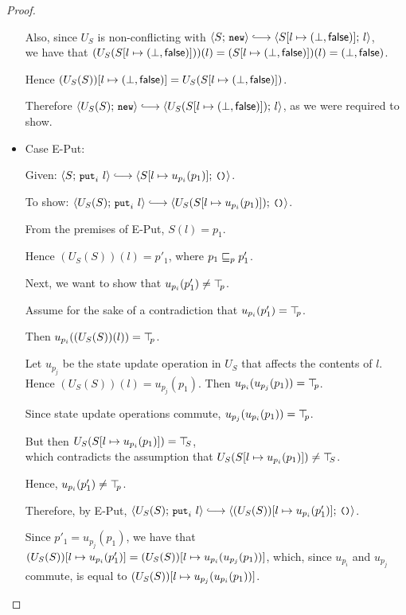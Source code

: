 \begin{proof}
\begin{itemize}
      Also, since $U_S$ is non-conflicting with $\config{S}{\NEW}
      \parstepsto \config{\extS{S}{l}{\bot}{\frozenfalse}}{l}$, \\ we
      have that $(U_S(S[l \mapsto (\bot, \textsf{false})]))(l) =
      (S[l \mapsto (\bot, \textsf{false})])(l) =
      (\bot, \textsf{false})$.

      Hence $(U_S(S))[l \mapsto (\bot, \textsf{false})] =
      U_S(S[l \mapsto (\bot, \textsf{false})])$.

      Therefore $\config{U_S(S)}{\NEW} \parstepsto
      \config{U_S(\extS{S}{l}{\bot}{\frozenfalse})}{l}$, as we were
      required to show.

    \item Case {\sc E-Put}:

      Given: $\config{S}{\putiexp{l}} \parstepsto
      \config{\extSRaw{S}{l}{u_{p_i}(p_1)}}{\unit}$.

      To show: $\config{U_S(S)}{\putiexp{l}} \parstepsto
      \config{U_S(\extSRaw{S}{l}{u_{p_i}(p_1)})}{\unit}$.

      From the premises of {\sc E-Put}, $S(l) = p_1$.

      Hence $(U_S(S))(l) = p'_1$, where $p_1 \sqsubseteq_p p'_1$.

      Next, we want to show that $u_{p_i}(p'_1) \neq \top\hspace{-0.85mm}_{p}$.

      Assume for the sake of a contradiction that $u_{p_i}(p'_1) =
      \top\hspace{-0.85mm}_{p}$.

      Then $u_{p_i}((U_S(S))(l)) = \top\hspace{-0.85mm}_{p}$.

      Let $u_{p_j}$ be the state update operation in $U_S$ that
      affects the contents of $l$.  Hence $(U_S(S))(l) =
      u_{p_j}(p_1)$. Then $u_{p_i}(u_{p_j}(p_1)) = \top\hspace{-0.85mm}_{p}$.

      Since state update operations commute, $u_{p_j}(u_{p_i}(p_1)) =
      \top\hspace{-0.85mm}_{p}$.
      
      But then $U_S(S[l \mapsto u_{p_i}(p_1)]) = \top\hspace{-0.85mm}_{S}$, \\
      which contradicts the assumption that
      $U_S(S[l \mapsto u_{p_i}(p_1)]) \neq \top\hspace{-0.85mm}_{S}$.

      Hence, $u_{p_i}(p'_1) \neq \top\hspace{-0.85mm}_{p}$.

      Therefore, by {\sc E-Put}, $\config{U_S(S)}{\putiexp{l}}
      \parstepsto
      \config{\extSRaw{(U_S(S))}{l}{u_{p_i}(p'_1)}}{\unit}$.

      Since $p'_1 = u_{p_j}(p_1)$, we have that
      $(U_S(S))[l \mapsto u_{p_i}(p'_1)] =
      (U_S(S))[l \mapsto u_{p_i}(u_{p_j}(p_1))]$, which, since
      $u_{p_i}$ and $u_{p_j}$ commute, is equal to
      $(U_S(S))[l \mapsto u_{p_j}(u_{p_i}(p_1))]$.


\end{itemize}
\end{proof}
